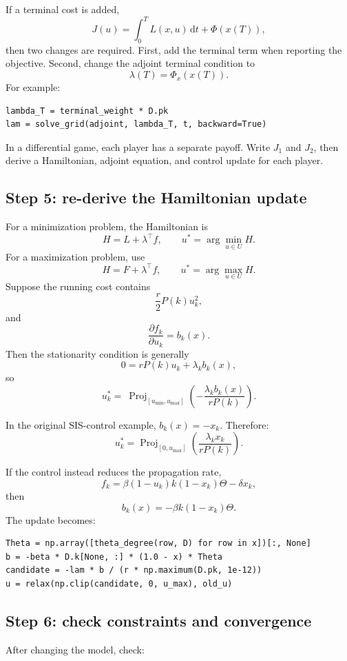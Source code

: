 \documentclass[11pt,a4paper]{article}
\newcommand{\dd}{\,\mathrm{d}}
\newcommand{\Proj}{\operatorname{Proj}}
\begin{document}
If a terminal cost is added,
\[
  J(u)=\int_0^T L(x,u)\dd t+\Phi(x(T)),
\]
then two changes are required. First, add the terminal term when reporting the objective. Second, change the adjoint terminal condition to
\[
  \lambda(T)=\Phi_x(x(T)).
\]
For example:

\begin{lstlisting}[style=py]
lambda_T = terminal_weight * D.pk
lam = solve_grid(adjoint, lambda_T, t, backward=True)
\end{lstlisting}

In a differential game, each player has a separate payoff. Write \(J_1\) and \(J_2\), then derive a Hamiltonian, adjoint equation, and control update for each player.

\subsection{Step 5: re-derive the Hamiltonian update}

For a minimization problem, the Hamiltonian is
\[
  H=L+\lambda^\top f,
  \qquad
  u^*=\arg\min_{u\in U}H.
\]
For a maximization problem, use
\[
  H=F+\lambda^\top f,
  \qquad
  u^*=\arg\max_{u\in U}H.
\]
Suppose the running cost contains
\[
  \frac{r}{2}P(k)u_k^2,
\]
and
\[
  \frac{\partial f_k}{\partial u_k}=b_k(x).
\]
Then the stationarity condition is generally
\[
  0=rP(k)u_k+\lambda_k b_k(x),
\]
so
\[
  u_k^*=\
  \Proj_{[u_{\min},u_{\max}]}
  \left(-\frac{\lambda_k b_k(x)}{rP(k)}\right).
\]

In the original SIS-control example, \(b_k(x)=-x_k\). Therefore:
\[
  u_k^*=
  \Proj_{[0,u_{\max}]}
  \left(\frac{\lambda_kx_k}{rP(k)}\right).
\]

If the control instead reduces the propagation rate,
\[
  f_k=\beta(1-u_k)k(1-x_k)\Theta-\delta x_k,
\]
then
\[
  b_k(x)=-\beta k(1-x_k)\Theta.
\]
The update becomes:

\begin{lstlisting}[style=py]
Theta = np.array([theta_degree(row, D) for row in x])[:, None]
b = -beta * D.k[None, :] * (1.0 - x) * Theta
candidate = -lam * b / (r * np.maximum(D.pk, 1e-12))
u = relax(np.clip(candidate, 0, u_max), old_u)
\end{lstlisting}

\subsection{Step 6: check constraints and convergence}

After changing the model, check:
\end{document}
